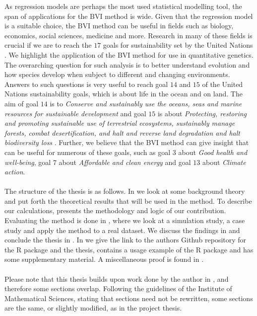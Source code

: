 As regression models are perhaps the most used statistical modelling tool, the span of applications for the BVI method is wide. Given that the regression model is a suitable choice, the BVI method can be useful in fields such as biology, economics, social sciences, medicine and more. Research in many of these fields is crucial if we are to reach the $17$ goals for sustainability set by the United Nations \citep{un_sdg_goals}. We highlight the application of the BVI method for use in quantitative genetics. The overarching question for such analysis is to better understand evolution and how species develop when subject to different and changing environments. Answers to such questions is very useful to reach goal $14$ and $15$ of the United Nations sustainability goals, which is about life in the ocean and on land. The aim of goal $14$ is to \textit{Conserve and sustainably use the oceans, seas and marine resources for sustainable development} and goal $15$ is about \textit{Protecting, restoring and promoting sustainable use of terrestrial ecosystems, sustainably manage forests, combat desertification, and halt and reverse land degradation and halt biodiversity loss} \citep{un_sdg_goals}. Further, we believe that the BVI method can give insight that can be useful for numerous of these goals, such as goal $3$ about \textit{Good health and well-being}, goal $7$ about \textit{Affordable and clean energy} and goal $13$ about \textit{Climate action}.
\\
\\
The structure of the thesis is as follows. In  we look at some background theory and put forth the theoretical results that will be used in the method. To describe our calculations,  presents the methodology and logic of our contribution. Evaluating the method is done in , where we look at a simulation study, a case study and apply the method to a real dataset. We discuss the findings in  and conclude the thesis in . In  we give the link to the authors Github repository for the R package and the thesis,  contains a usage example of the R package and  has some supplementary material. A miscellaneous proof is found in . 
\\
\\
Please note that this thesis builds upon work done by the author in \citet{Arnstad:Relative_variable_importance_in_Bayesian_linear_mixed_models:2024}, and therefore some sections overlap. Following the guidelines of the Institute of Mathematical Sciences, stating that sections need not be rewritten, some sections are the same, or slightly modified, as in the project thesis.